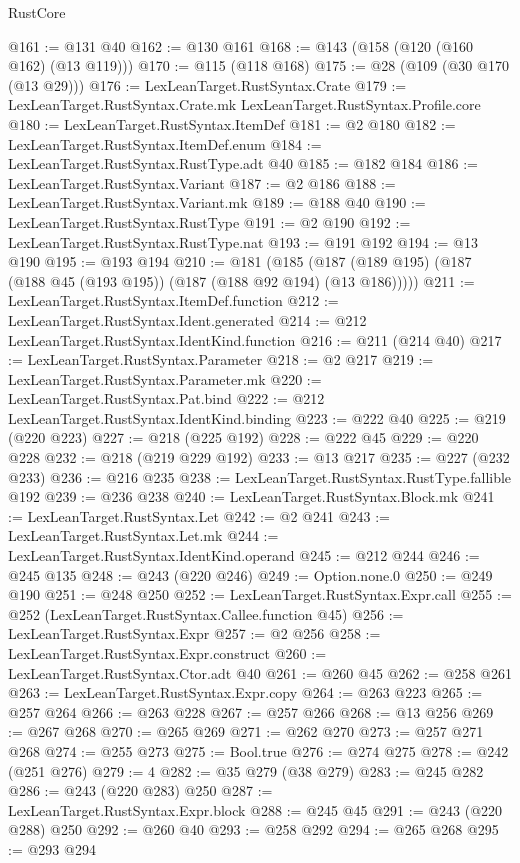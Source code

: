 \begin{lexlean}{RustCore}
\begin{coremodule}
{\begin{coremodule}
{{{{{{@161 := @131 @40
@162 := @130 @161
@168 := @143 (@158 (@120 (@160 @162) (@13 @119)))
@170 := @115 (@118 @168)
@175 := @28 (@109 (@30 @170 (@13 @29)))
@176 := LexLeanTarget.RustSyntax.Crate
@179 := LexLeanTarget.RustSyntax.Crate.mk LexLeanTarget.RustSyntax.Profile.core
@180 := LexLeanTarget.RustSyntax.ItemDef
@181 := @2 @180
@182 := LexLeanTarget.RustSyntax.ItemDef.enum
@184 := LexLeanTarget.RustSyntax.RustType.adt @40
@185 := @182 @184
@186 := LexLeanTarget.RustSyntax.Variant
@187 := @2 @186
@188 := LexLeanTarget.RustSyntax.Variant.mk
@189 := @188 @40
@190 := LexLeanTarget.RustSyntax.RustType
@191 := @2 @190
@192 := LexLeanTarget.RustSyntax.RustType.nat
@193 := @191 @192
@194 := @13 @190
@195 := @193 @194
@210 := @181
    (@185 (@187 (@189 @195) (@187 (@188 @45 (@193 @195)) (@187 (@188 @92 @194) (@13 @186)))))
@211 := LexLeanTarget.RustSyntax.ItemDef.function
@212 := LexLeanTarget.RustSyntax.Ident.generated
@214 := @212 LexLeanTarget.RustSyntax.IdentKind.function
@216 := @211 (@214 @40)
@217 := LexLeanTarget.RustSyntax.Parameter
@218 := @2 @217
@219 := LexLeanTarget.RustSyntax.Parameter.mk
@220 := LexLeanTarget.RustSyntax.Pat.bind
@222 := @212 LexLeanTarget.RustSyntax.IdentKind.binding
@223 := @222 @40
@225 := @219 (@220 @223)
@227 := @218 (@225 @192)
@228 := @222 @45
@229 := @220 @228
@232 := @218 (@219 @229 @192)
@233 := @13 @217
@235 := @227 (@232 @233)
@236 := @216 @235
@238 := LexLeanTarget.RustSyntax.RustType.fallible @192
@239 := @236 @238
@240 := LexLeanTarget.RustSyntax.Block.mk
@241 := LexLeanTarget.RustSyntax.Let
@242 := @2 @241
@243 := LexLeanTarget.RustSyntax.Let.mk
@244 := LexLeanTarget.RustSyntax.IdentKind.operand
@245 := @212 @244
@246 := @245 @135
@248 := @243 (@220 @246)
@249 := Option.none.{0}
@250 := @249 @190
@251 := @248 @250
@252 := LexLeanTarget.RustSyntax.Expr.call
@255 := @252 (LexLeanTarget.RustSyntax.Callee.function @45)
@256 := LexLeanTarget.RustSyntax.Expr
@257 := @2 @256
@258 := LexLeanTarget.RustSyntax.Expr.construct
@260 := LexLeanTarget.RustSyntax.Ctor.adt @40
@261 := @260 @45
@262 := @258 @261
@263 := LexLeanTarget.RustSyntax.Expr.copy
@264 := @263 @223
@265 := @257 @264
@266 := @263 @228
@267 := @257 @266
@268 := @13 @256
@269 := @267 @268
@270 := @265 @269
@271 := @262 @270
@273 := @257 @271 @268
@274 := @255 @273
@275 := Bool.true
@276 := @274 @275
@278 := @242 (@251 @276)
@279 := 4
@282 := @35 @279 (@38 @279)
@283 := @245 @282
@286 := @243 (@220 @283) @250
@287 := LexLeanTarget.RustSyntax.Expr.block
@288 := @245 @45
@291 := @243 (@220 @288) @250
@292 := @260 @40
@293 := @258 @292
@294 := @265 @268
@295 := @293 @294
}}}}}}
\end{coremodule}}
\end{coremodule}
\end{lexlean}
